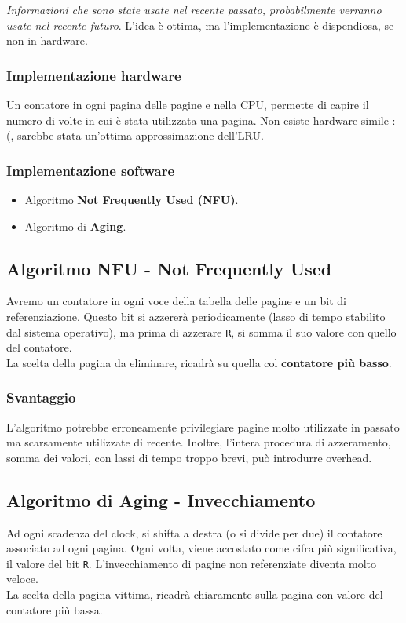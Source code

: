 \documentclass{report}
\begin{document}
\textit{Informazioni che sono state usate nel recente passato, probabilmente verranno usate nel recente futuro}. L'idea è ottima, ma l'implementazione è dispendiosa, se non in hardware.

\subsubsection{Implementazione hardware}
Un contatore in ogni pagina delle pagine e nella CPU, permette di capire il numero di volte in cui è stata utilizzata una pagina. Non esiste hardware simile :(, sarebbe stata un'ottima approssimazione dell'LRU.

\subsubsection{Implementazione software}
\begin{itemize}
    \item Algoritmo \textbf{Not Frequently Used (NFU)}.
    \item Algoritmo di \textbf{Aging}.
\end{itemize}


\subsection{Algoritmo NFU - Not Frequently Used}
Avremo un contatore in ogni voce della tabella delle pagine e un bit di referenziazione. Questo bit si azzererà periodicamente (lasso di tempo stabilito dal sistema operativo), ma prima di azzerare \verb|R|, si somma il suo valore con quello del contatore.\\
La scelta della pagina da eliminare, ricadrà su quella col \textbf{contatore più basso}.


\subsubsection{Svantaggio}
L'algoritmo potrebbe erroneamente privilegiare pagine molto utilizzate in passato ma scarsamente utilizzate di recente. Inoltre, l'intera procedura di azzeramento, somma dei valori, con lassi di tempo troppo brevi, può introdurre overhead.

\newpage

\subsection{Algoritmo di Aging - Invecchiamento}
Ad ogni scadenza del clock, si shifta a destra (o si divide per due) il contatore associato ad ogni pagina. Ogni volta, viene accostato come cifra più significativa, il valore del bit \verb|R|. L'invecchiamento di pagine non referenziate diventa molto veloce.\\
La scelta della pagina vittima, ricadrà chiaramente sulla pagina con valore del contatore più bassa.
\end{document}
